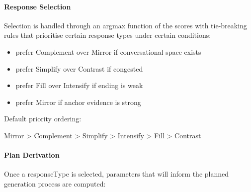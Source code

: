 \paragraph{Response Selection}\label{response-selection}

Selection is handled through an argmax function of the scores with
tie-breaking rules that prioritise certain response types under certain
conditions:

\begin{itemize}
\item
  prefer Complement over Mirror if conversational space exists
\item
  prefer Simplify over Contrast if congested
\item
  prefer Fill over Intensify if ending is weak
\item
  prefer Mirror if anchor evidence is strong
\end{itemize}

Default priority ordering:

Mirror \textgreater{} Complement \textgreater{} Simplify \textgreater{}
Intensify \textgreater{} Fill \textgreater{} Contrast

\paragraph{Plan Derivation}\label{plan-derivation}

Once a responseType is selected, parameters that will inform the planned
generation process are computed:

